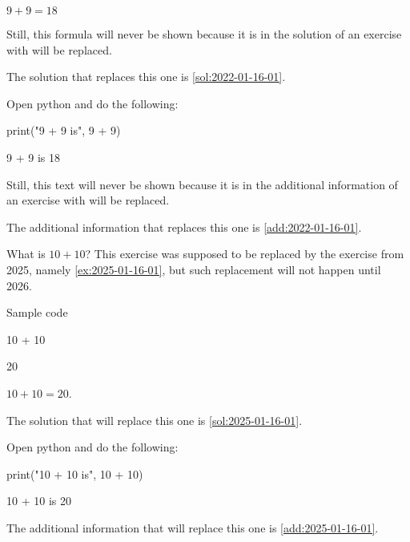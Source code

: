 \documentclass[oneside]{book}
\begin{document}
\begin{solution}
  \(9 + 9 = 18\)

Still, this formula will never be shown because it is in the solution of an exercise with will be replaced.

The solution that replaces this one is \cref{sol:2022-01-16-01}.
\end{solution}

\begin{additionalinformation}
Open python and do the following:

\begin{pycell}
print("9 + 9 is", 9 + 9)
\end{pycell}
\begin{pyexpectedoutput}
9 + 9 is 18
\end{pyexpectedoutput}

Still, this text will never be shown because it is in the additional information of an exercise with will be replaced.

The additional information that replaces this one is \cref{add:2022-01-16-01}.
\end{additionalinformation}

\begin{exercise}[examdate={January 16, 2024}, examproblemnumber={1}, examproblemid={2024-01-16-01}, replacedbyexamproblemid={2023-01-16-01}, replacementsinceacademicyear={2026/2027}]
  What is \(10 + 10\)? This exercise was supposed to be replaced by the exercise from 2025, namely \cref{ex:2025-01-16-01}, but such replacement will not happen until 2026.

Sample code
\begin{pycell}
10 + 10
\end{pycell}
\begin{pyexpectedoutput}
20
\end{pyexpectedoutput}
\end{exercise}

\begin{solution}
  \(10 + 10 = 20\).

  The solution that will replace this one is \cref{sol:2025-01-16-01}.
\end{solution}

\begin{additionalinformation}
Open python and do the following:

\begin{pycell}
print("10 + 10 is", 10 + 10)
\end{pycell}
\begin{pyexpectedoutput}
10 + 10 is 20
\end{pyexpectedoutput}

The additional information that will replace this one is \cref{add:2025-01-16-01}.
\end{additionalinformation}
\end{document}
